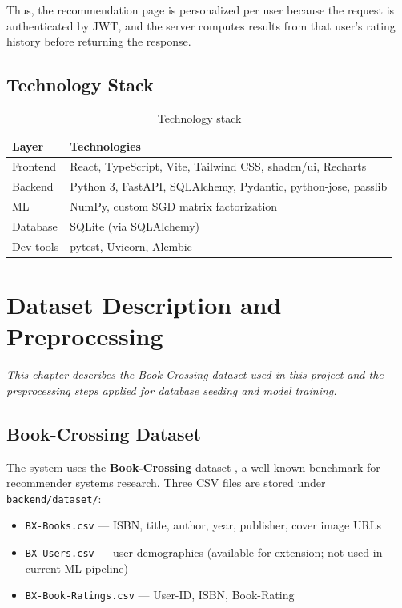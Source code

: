 \documentclass[12pt,a4paper]{report}
\newcommand{\chapterdesc}[1]{%
    \vspace{-0.6\baselineskip}
    \noindent\hspace*{1.5cm}\parbox{\dimexpr\textwidth-1.5cm\relax}{\textit{#1}}
    \par\vspace{0.3\baselineskip}
}
\begin{document}
Thus, the recommendation page is personalized per user because the request is authenticated by JWT, and the server computes results from that user's rating history before returning the response.

\section{Technology Stack}

\begin{table}[htbp]
\centering
\caption{Technology stack}
\label{tab:stack}
\begin{tabular}{@{}ll@{}}
\toprule
\textbf{Layer} & \textbf{Technologies} \\
\midrule
Frontend & React, TypeScript, Vite, Tailwind CSS, shadcn/ui, Recharts \\
Backend & Python 3, FastAPI, SQLAlchemy, Pydantic, python-jose, passlib \cite{fastapi,sqlalchemy,pydantic,jwt_rfc} \\
ML & NumPy, custom SGD matrix factorization \\
Database & SQLite (via SQLAlchemy) \\
Dev tools & pytest, Uvicorn, Alembic \\
\bottomrule
\end{tabular}
\end{table}

\chapter{Dataset Description and Preprocessing}
\chapterdesc{This chapter describes the Book-Crossing dataset used in this project and the preprocessing steps applied for database seeding and model training.}

\section{Book-Crossing Dataset}

The system uses the \textbf{Book-Crossing} dataset \cite{bookcrossing}, a well-known benchmark for recommender systems research. Three CSV files are stored under \texttt{backend/dataset/}:
\begin{itemize}
    \item \texttt{BX-Books.csv} --- ISBN, title, author, year, publisher, cover image URLs
    \item \texttt{BX-Users.csv} --- user demographics (available for extension; not used in current ML pipeline)
    \item \texttt{BX-Book-Ratings.csv} --- User-ID, ISBN, Book-Rating
\end{itemize}
\end{document}
